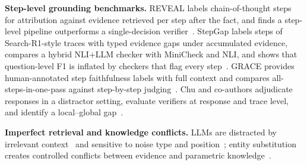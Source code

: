 \documentclass[conference]{IEEEtran}
\begin{document}
\textbf{Step-level grounding benchmarks.}
REVEAL labels chain-of-thought steps for attribution against evidence retrieved per step after the fact, and finds a step-level pipeline outperforms a single-decision verifier~\cite{jacovi2024reveal}. StepGap labels steps of Search-R1-style traces with typed evidence gaps under accumulated evidence, compares a hybrid NLI+LLM checker with MiniCheck and NLI, and shows that question-level F1 is inflated by checkers that flag every step~\cite{ji2026stepgap}. GRACE provides human-annotated step faithfulness labels with full context and compares all-steps-in-one-pass against step-by-step judging~\cite{pham2026grace}. Chu and co-authors adjudicate responses in a distractor setting, evaluate verifiers at response and trace level, and identify a local--global gap~\cite{chu2026locally}.

\textbf{Imperfect retrieval and knowledge conflicts.}
LLMs are distracted by irrelevant context~\cite{shi2023distracted,yoran2024robust} and sensitive to noise type and position~\cite{cuconasu2024noise}; entity substitution creates controlled conflicts between evidence and parametric knowledge~\cite{longpre2021entity}.

\begin{table}[t]
\caption{Closest work and the variables this study manipulates.}\label{tab:related}
\centering\small
{}
\end{table}
\end{document}
